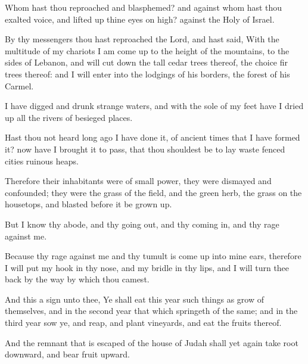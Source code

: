 {Whom hast thou
reproached and
blasphemed? and against whom hast thou
exalted
{}
voice, and lifted
up thine
eyes on
high?
{} against the
Holy
{} of
Israel.

By thy
messengers thou hast
reproached the
Lord, and hast
said, With the
multitude of my
chariots I am come
up to the
height of the
mountains, to the
sides of
Lebanon, and will cut
down the
tall cedar
trees thereof,
{} the
choice fir
trees thereof: and I will
enter into the
lodgings of his
borders,
{} the
forest of his
Carmel.

I have
digged and
drunk
strange
waters, and with the
sole of my
feet have I
dried up all the
rivers of besieged
places.

Hast thou not
heard long
ago
{} I have
done it,
{} of
ancient
times that I have
formed it? now have I
brought it to pass, that thou shouldest be to lay
waste
fenced
cities
{}
ruinous
heaps.

Therefore their
inhabitants were of
small
power, they were
dismayed and
confounded; they were
{} the
grass of the
field, and
{} the
green
herb,
{} the
grass on the
housetops, and
{}
blasted
before it be grown
up.

But I
know thy
abode, and thy going
out, and thy coming
in, and thy
rage against me.

Because thy
rage against me and thy
tumult is come
up into mine
ears, therefore I will
put my
hook in thy
nose, and my
bridle in thy
lips, and I will turn thee
back by the
way by which thou
camest.

And this
{} a
sign unto thee, Ye shall
eat this
year such things as
grow of themselves, and in the
second
year that which
springeth of the same; and in the
third
year
sow ye, and
reap, and
plant
vineyards, and
eat the
fruits thereof.

And the
remnant that is
escaped of the
house of
Judah shall yet
again take
root
downward, and
bear
fruit
upward.

}
